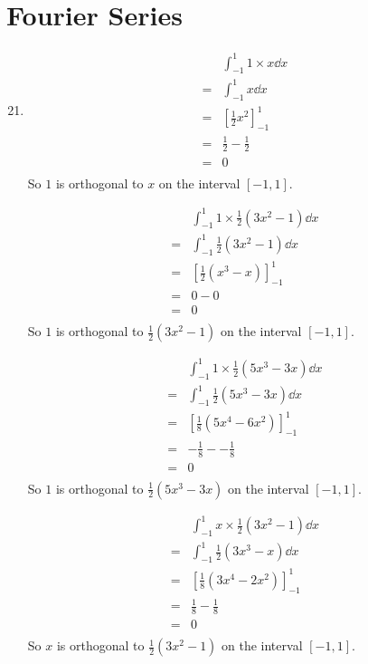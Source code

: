 \documentclass[10pt,\jkfside,a4paper]{article}
\begin{document}
\section*{Fourier Series}

\begin{enumerate}

\setcounter{enumi}{20}

\item 

\[
\begin{split}
 & \int^1_{-1} 1 \times x \dd{x} \\
=& \int^1_{-1} x \dd{x} \\
=& \left[\frac{1}{2}x^2 \right]^1_{-1} \\
=& \frac{1}{2} - \frac{1}{2} \\
=& 0 \\
\end{split}
\]
So $1$ is orthogonal to $x$ on the interval $[-1, 1]$.

\[
\begin{split}
 & \int^1_{-1} 1 \times \frac{1}{2}(3x^2 - 1) \dd{x} \\
=& \int^1_{-1} \frac{1}{2}(3x^2 - 1) \dd{x} \\
=& \left[\frac{1}{2}(x^3 - x) \right]^1_{-1} \\
=& 0 - 0 \\
=& 0 \\
\end{split}
\]
So $1$ is orthogonal to $\frac{1}{2}(3x^2 - 1)$ on the interval $[-1, 1]$.

\[
\begin{split}
 & \int^1_{-1} 1 \times \frac{1}{2}(5x^3 - 3x) \dd{x} \\
=& \int^1_{-1} \frac{1}{2}(5x^3 - 3x) \dd{x} \\
=& \left[\frac{1}{8}(5x^4 - 6x^2) \right]^1_{-1} \\
=& -\frac{1}{8} - - \frac{1}{8} \\
=& 0 \\
\end{split}
\]
So $1$ is orthogonal to $\frac{1}{2}(5x^3 - 3x)$ on the interval $[-1, 1]$.

\[
\begin{split}
 & \int^1_{-1} x \times \frac{1}{2}(3x^2 - 1) \dd{x} \\ 
=& \int^1_{-1} \frac{1}{2}(3x^3 - x) \dd{x} \\
=& \left[ \frac{1}{8}(3x^4 - 2x^2) \right]^1_{-1} \\
=& \frac{1}{8} - \frac{1}{8} \\
=& 0 \\
\end{split}
\]
So $x$ is orthogonal to $\frac{1}{2}(3x^2 - 1)$ on the interval $[-1, 1]$.


\end{enumerate}
\end{document}
